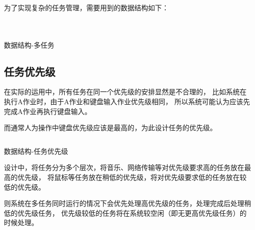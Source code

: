 为了实现复杂的任务管理，需要用到的数据结构如下：
\begin{listing}[H]
  \inputminted[tabsize=2, firstline=227, lastline=232,
    linenos=true]{c}{../ZOS/src/kernel/bootpack.h}
  \inputminted[tabsize=2, firstline=222, lastline=226,
    linenos=true]{c}{../ZOS/src/kernel/bootpack.h}
  \inputminted[tabsize=2, firstline=209, lastline=221,
    linenos=true]{c}{../ZOS/src/kernel/bootpack.h}
  \caption{数据结构-多任务}
  \label{lst:multi_task}
\end{listing}

\subsection{任务优先级}

在实际的运用中，所有任务在同一个优先级的安排显然是不合理的，
比如系统在执行A作业时，由于A作业和键盘输入作业优先级相同，
所以系统可能认为应该先完成A作业再执行键盘输入。

而通常人为操作中键盘优先级应该是最高的，为此设计任务的优先级。

\begin{listing}[H]
  \inputminted[tabsize=2, firstline=222, lastline=226,
    linenos=true]{c}{../ZOS/src/kernel/bootpack.h}
  \caption{数据结构-任务优先级}
  \label{lst:task_level}
\end{listing}

设计中，将任务分为多个层次，将音乐、网络传输等对优先级要求高的任务放在最高的优先级，
将鼠标等任务放在稍低的优先级，将对优先级要求低的任务放在较低的优先级。

则系统在多任务同时运行的情况下会优先处理高优先级的任务，处理完成后处理稍低的优先级任务，
优先级较低的任务将在系统较空闲（即无更高优先级任务）的时候处理。

% 
% 
% 

